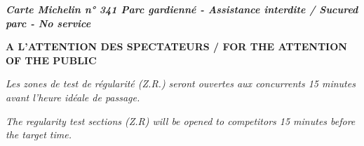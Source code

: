 \documentclass{article}%
\begin{document}
\begin{flushleft} \textit{\textbf{Carte Michelin n° 341                                       Parc gardienné - Assistance interdite / Sucured parc - No service}} \end{flushleft}%
\begin{center} \textbf{A L’ATTENTION DES SPECTATEURS / FOR THE ATTENTION OF THE PUBLIC} \end{center}%
\begin{center} \textit{Les zones de test de régularité (Z.R.) seront ouvertes aux concurrents 15 minutes avant l’heure idéale de passage.} \end{center}%
\begin{center} \textit{The regularity test sections (Z.R) will be opened to competitors 15 minutes before the target time.} \end{center}%
\end{document}
